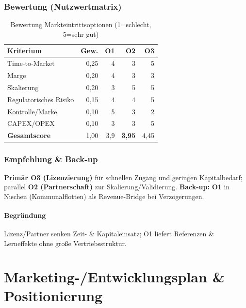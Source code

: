 \documentclass[
%
ngerman %
%
numeric %
]{wbh-assignment}
\begin{document}
\subsubsection{Bewertung (Nutzwertmatrix)}
\begin{table}[htb!]
\centering
\caption{Bewertung Markteintrittsoptionen (1=schlecht, 5=sehr gut)}
\begin{tabular}{l r r r r}
\textbf{Kriterium} & \textbf{Gew.} & \textbf{O1} & \textbf{O2} & \textbf{O3} \\
\hline
Time-to-Market & 0{,}25 & 4 & 3 & 5 \\
Marge & 0{,}20 & 4 & 3 & 3 \\
Skalierung & 0{,}20 & 3 & 5 & 5 \\
Regulatorisches Risiko & 0{,}15 & 4 & 4 & 5 \\
Kontrolle/Marke & 0{,}10 & 5 & 3 & 2 \\
CAPEX/OPEX & 0{,}10 & 3 & 3 & 5 \\
\hline
\textbf{Gesamtscore} & 1{,}00 & 3{,}9 & \textbf{3{,}95} & 4{,}45 \\
\end{tabular}
\end{table}

\subsubsection{Empfehlung \& Back-up}
\textbf{Primär O3 (Lizenzierung)} für schnellen Zugang und geringen Kapitalbedarf; parallel \textbf{O2 (Partnerschaft)} zur Skalierung/Validierung. \textbf{Back-up:} \textbf{O1} in Nischen (Kommunalflotten) als Revenue-Bridge bei Verzögerungen.

\paragraph{Begründung}
Lizenz/Partner senken Zeit- \& Kapitaleinsatz; O1 liefert Referenzen \& Lerneffekte ohne große Vertriebsstruktur.

\clearpage

\section{Marketing-/Entwicklungsplan \& Positionierung}
\label{sec:3}
\end{document}
